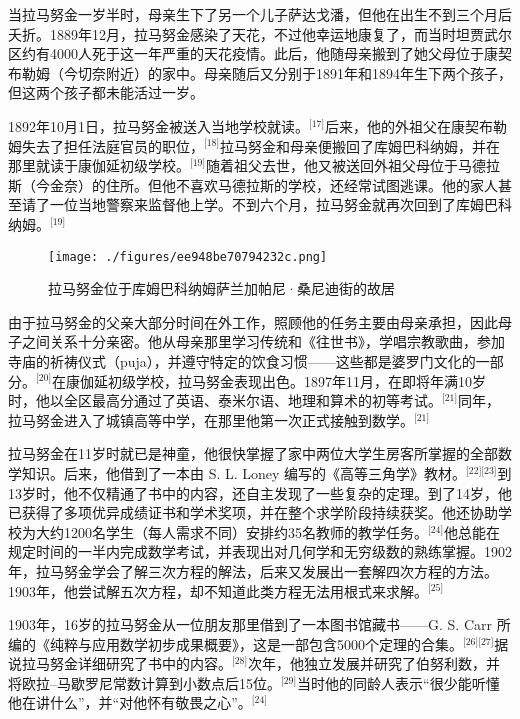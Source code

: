 当拉马努金一岁半时，母亲生下了另一个儿子萨达戈潘，但他在出生不到三个月后夭折。1889年12月，拉马努金感染了天花，不过他幸运地康复了，而当时坦贾武尔区约有4000人死于这一年严重的天花疫情。此后，他随母亲搬到了她父母位于康契布勒姆（今切奈附近）的家中。母亲随后又分别于1891年和1894年生下两个孩子，但这两个孩子都未能活过一岁。

1892年10月1日，拉马努金被送入当地学校就读。\(^\text{[17]}\)后来，他的外祖父在康契布勒姆失去了担任法庭官员的职位，\(^\text{[18]}\)拉马努金和母亲便搬回了库姆巴科纳姆，并在那里就读于康伽延初级学校。\(^\text{[19]}\)随着祖父去世，他又被送回外祖父母位于马德拉斯（今金奈）的住所。但他不喜欢马德拉斯的学校，还经常试图逃课。他的家人甚至请了一位当地警察来监督他上学。不到六个月，拉马努金就再次回到了库姆巴科纳姆。\(^\text{[19]}\)
\begin{figure}[ht]
\centering
\texttt{[image: ./figures/ee948be70794232c.png]}
\caption{拉马努金位于库姆巴科纳姆萨兰加帕尼·桑尼迪街的故居} \label{fig_LMLJ_2}
\end{figure}
由于拉马努金的父亲大部分时间在外工作，照顾他的任务主要由母亲承担，因此母子之间关系十分亲密。他从母亲那里学习传统和《往世书》，学唱宗教歌曲，参加寺庙的祈祷仪式（puja），并遵守特定的饮食习惯——这些都是婆罗门文化的一部分。\(^\text{[20]}\)在康伽延初级学校，拉马努金表现出色。1897年11月，在即将年满10岁时，他以全区最高分通过了英语、泰米尔语、地理和算术的初等考试。\(^\text{[21]}\)同年，拉马努金进入了城镇高等中学，在那里他第一次正式接触到数学。\(^\text{[21]}\)

拉马努金在11岁时就已是神童，他很快掌握了家中两位大学生房客所掌握的全部数学知识。后来，他借到了一本由 S. L. Loney 编写的《高等三角学》教材。\(^\text{[22][23]}\)到13岁时，他不仅精通了书中的内容，还自主发现了一些复杂的定理。到了14岁，他已获得了多项优异成绩证书和学术奖项，并在整个求学阶段持续获奖。他还协助学校为大约1200名学生（每人需求不同）安排约35名教师的教学任务。\(^\text{[24]}\)他总能在规定时间的一半内完成数学考试，并表现出对几何学和无穷级数的熟练掌握。1902年，拉马努金学会了解三次方程的解法，后来又发展出一套解四次方程的方法。1903年，他尝试解五次方程，却不知道此类方程无法用根式来求解。\(^\text{[25]}\)

1903年，16岁的拉马努金从一位朋友那里借到了一本图书馆藏书——G. S. Carr 所编的《纯粹与应用数学初步成果概要》，这是一部包含5000个定理的合集。\(^\text{[26][27]}\)据说拉马努金详细研究了书中的内容。\(^\text{[28]}\)次年，他独立发展并研究了伯努利数，并将欧拉–马歇罗尼常数计算到小数点后15位。\(^\text{[29]}\)当时他的同龄人表示“很少能听懂他在讲什么”，并“对他怀有敬畏之心”。\(^\text{[24]}\)

